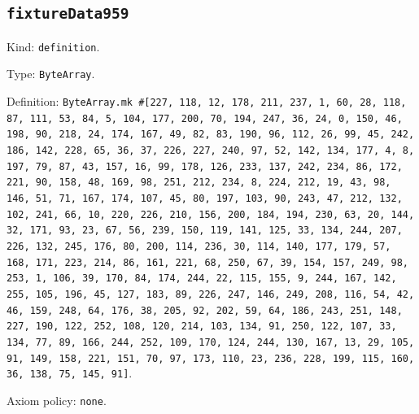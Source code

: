 \documentclass[11pt]{article}
\begin{document}
\subsection*{\texttt{fixtureData959}}
\noindent Kind: \texttt{definition}.\par
\noindent Type: \texttt{ByteArray}.\par
\noindent Definition: \texttt{ByteArray.mk \#[227, 118, 12, 178, 211, 237, 1, 60, 28, 118, 87, 111, 53, 84, 5, 104, 177, 200, 70, 194, 247, 36, 24, 0, 150, 46, 198, 90, 218, 24, 174, 167, 49, 82, 83, 190, 96, 112, 26, 99, 45, 242, 186, 142, 228, 65, 36, 37, 226, 227, 240, 97, 52, 142, 134, 177, 4, 8, 197, 79, 87, 43, 157, 16, 99, 178, 126, 233, 137, 242, 234, 86, 172, 221, 90, 158, 48, 169, 98, 251, 212, 234, 8, 224, 212, 19, 43, 98, 146, 51, 71, 167, 174, 107, 45, 80, 197, 103, 90, 243, 47, 212, 132, 102, 241, 66, 10, 220, 226, 210, 156, 200, 184, 194, 230, 63, 20, 144, 32, 171, 93, 23, 67, 56, 239, 150, 119, 141, 125, 33, 134, 244, 207, 226, 132, 245, 176, 80, 200, 114, 236, 30, 114, 140, 177, 179, 57, 168, 171, 223, 214, 86, 161, 221, 68, 250, 67, 39, 154, 157, 249, 98, 253, 1, 106, 39, 170, 84, 174, 244, 22, 115, 155, 9, 244, 167, 142, 255, 105, 196, 45, 127, 183, 89, 226, 247, 146, 249, 208, 116, 54, 42, 46, 159, 248, 64, 176, 38, 205, 92, 202, 59, 64, 186, 243, 251, 148, 227, 190, 122, 252, 108, 120, 214, 103, 134, 91, 250, 122, 107, 33, 134, 77, 89, 166, 244, 252, 109, 170, 124, 244, 130, 167, 13, 29, 105, 91, 149, 158, 221, 151, 70, 97, 173, 110, 23, 236, 228, 199, 115, 160, 36, 138, 75, 145, 91]}.\par
\noindent Axiom policy: \texttt{none}.\par
\end{document}
